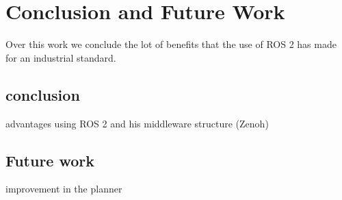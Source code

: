 \part{Conclusion and Future Work}
Over this work we conclude the lot of benefits that the use of ROS 2 has made for an industrial standard.
\chapter{conclusion}
advantages using ROS 2 and his middleware structure (Zenoh)
\chapter{Future work}
improvement in the planner